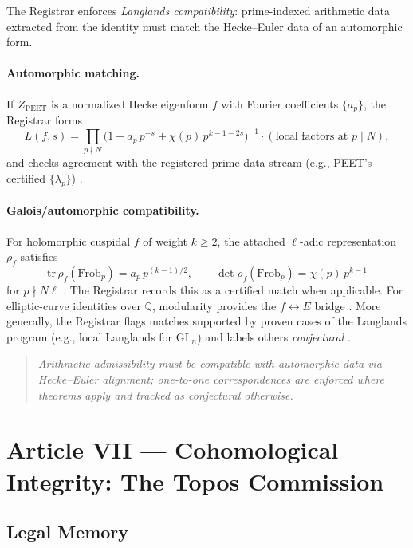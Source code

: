\documentclass[12pt]{amsart}
\theoremstyle{plain}
\begin{document}
The Registrar enforces \emph{Langlands compatibility}: prime-indexed arithmetic data extracted from the identity must match the Hecke–Euler data of an automorphic form.

\paragraph{Automorphic matching.}
If $Z_{\mathrm{PEET}}$ is a normalized Hecke eigenform $f$ with Fourier coefficients $\{a_p\}$, the Registrar forms
\[
L(f,s)=\prod_{p\nmid N}\Big(1-a_p\,p^{-s}+\chi(p)\,p^{k-1-2s}\Big)^{-1}\cdot(\text{local factors at }p\mid N),
\]
and checks agreement with the registered prime data stream (e.g., PEET’s certified $\{\lambda_p\}$) \cite{godement1972zeta,diamond2005first}.

\paragraph{Galois/automorphic compatibility.}
For holomorphic cuspidal $f$ of weight $k\ge2$, the attached $\ell$-adic representation $\rho_f$ satisfies
\[
\mathrm{tr}\,\rho_f(\mathrm{Frob}_p)=a_p\,p^{(k-1)/2},\qquad
\det\rho_f(\mathrm{Frob}_p)=\chi(p)\,p^{k-1}
\]
for $p\nmid N\ell$ \cite{deligne1971formes}. The Registrar records this as a certified match when applicable. For elliptic-curve identities over $\mathbb{Q}$, modularity provides the $f\leftrightarrow E$ bridge \cite{wiles1995modular,taylor1995ring}. More generally, the Registrar flags matches supported by proven cases of the Langlands program (e.g., local Langlands for $\mathrm{GL}_n$) and labels others \emph{conjectural} \cite{langlands1970problems,harris2001geometry}.

\begin{quote}
\textit{Arithmetic admissibility must be compatible with automorphic data via Hecke–Euler alignment; one-to-one correspondences are enforced where theorems apply and tracked as conjectural otherwise.}
\end{quote}

\section{Article VII — Cohomological Integrity: The Topos Commission}

\subsection{Legal Memory}
\end{document}
